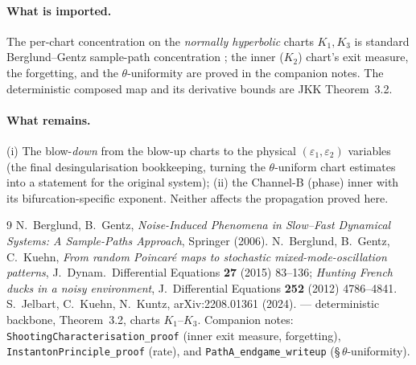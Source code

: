 \documentclass[11pt]{article}
\theoremstyle{definition}
\theoremstyle{remark}
\begin{document}
\paragraph{What is imported.} The per-chart concentration on the \emph{normally
hyperbolic} charts $K_1,K_3$ is standard Berglund--Gentz sample-path concentration
\cite{BG,BGK}; the inner ($K_2$) chart's exit measure, the forgetting, and the
$\theta$-uniformity are proved in the companion notes. The deterministic composed map and
its derivative bounds are JKK Theorem~3.2.

\paragraph{What remains.} (i) The blow-\emph{down} from the blow-up charts to the physical
$(\varepsilon_1,\varepsilon_2)$ variables (the final desingularisation bookkeeping,
turning the $\theta$-uniform chart estimates into a statement for the original system);
(ii) the Channel-B (phase) inner with its bifurcation-specific exponent. Neither affects
the propagation proved here.

\begin{thebibliography}{9}
 N.~Berglund, B.~Gentz, \emph{Noise-Induced Phenomena in Slow--Fast
Dynamical Systems: A Sample-Paths Approach}, Springer (2006).
 N.~Berglund, B.~Gentz, C.~Kuehn, \emph{From random Poincar\'e maps to
stochastic mixed-mode-oscillation patterns}, J.\ Dynam.\ Differential Equations
\textbf{27} (2015) 83--136; \emph{Hunting French ducks in a noisy environment},
J.\ Differential Equations \textbf{252} (2012) 4786--4841.
 S.~Jelbart, C.~Kuehn, N.~Kuntz, arXiv:2208.01361 (2024). --- deterministic
backbone, Theorem~3.2, charts $K_1$--$K_3$.
 Companion notes: \texttt{ShootingCharacterisation\_proof} (inner exit
measure, forgetting), \texttt{InstantonPrinciple\_proof} (rate), and
\texttt{PathA\_endgame\_writeup} (\S\,$\theta$-uniformity).
\end{thebibliography}
\end{document}
